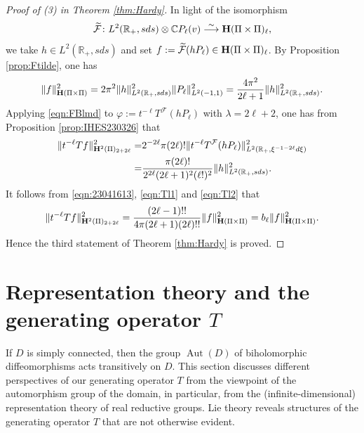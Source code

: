 \documentclass[12pt,leqno]{amsart}
\theoremstyle{plain}
\theoremstyle{definition}
\begin{document}
\begin{proof}
[Proof of (3) in Theorem \ref{thm:Hardy}]
In light of the isomorphism
\[
\widetilde{\mathcal{F}} \colon L^2({\mathbb{R}}_+, s d s) \otimes {\mathbb{C}}P_{\ell}(v) \overset \sim \longrightarrow {\bf{H}}(\Pi \times \Pi)_{\ell}, 
\]
 we take $h \in L^2({\mathbb{R}}_+, s d s)$
 and set $f :=\widetilde{\mathcal{F}}(h P_{\ell}) \in  {\bf{H}}(\Pi \times \Pi)_{\ell}$.  
By Proposition \ref{prop:Ftilde}, 
 one has
\begin{equation}
\label{eqn:Tl1}
\|f\|_{ {\bf{H}}(\Pi \times \Pi)}^2
=2\pi^2 \|h\|_{L^2({\mathbb{R}}_+, s d s)}^2 \|P_{\ell}\|_{L^2(-1,1)}^2
=\frac{4\pi^2}{2 \ell+1}\|h\|_{L^2({\mathbb{R}}_+, s d s)}^2.  
\end{equation}
Applying \eqref{eqn:FBlmd} to 
$
   \varphi:=t^{-\ell}T^{{\mathcal{F}}}(h P_{\ell})
$
 with $\lambda=2\ell+2$, 
 one has from Proposition \ref{prop:IHES230326}
 that 
\begin{align}
\notag
\|t^{-\ell} T f\|_{{\bf{H}}^2(\Pi)_{2+2\ell}}^2
=&2^{-2\ell} \pi (2 \ell)! \|t^{-\ell} T^{\mathcal{F}} (h P_{\ell})\|_{L^2({\mathbb{R}}_+, \xi^{-1-2\ell} d \xi)}^2 
\\
\label{eqn:Tl2}
=&\frac{\pi (2 \ell)!}{2^{2 \ell}(2\ell+1)^2(\ell !)^2}\|h\|_{L^2({\mathbb{R}}_+, s d s)}^2.  
\end{align}
It follows from \eqref{eqn:23041613}, \eqref{eqn:Tl1} and \eqref{eqn:Tl2}
 that 
\[
  \|t^{-\ell} T f\|_{{\bf{H}}^2(\Pi)_{2+2\ell}}^2
  =
  \frac{(2\ell-1)!!}{4 \pi (2 \ell+1) (2\ell)!!}
  \|f\|_{{\bf{H}}(\Pi \times \Pi)}^2
  =
  b_{\ell} \|f\|_{{\bf{H}}(\Pi \times \Pi)}^2.   
\]
Hence the third statement of Theorem \ref{thm:Hardy} is proved.  
\end{proof}



\section{Representation theory and the generating operator $T$}
\label{sec:SL}

If $D$ is simply connected, 
 then the group $\operatorname{Aut}(D)$
 of biholomorphic diffeomorphisms 
 acts transitively on $D$.  
This section discusses different perspectives
 of our generating operator $T$ from the viewpoint
 of the automorphism group of the domain, 
 in particular, from the (infinite-dimensional) representation theory of real reductive groups.  
Lie theory reveals structures
 of the generating operator $T$
 that are not otherwise evident.  
\end{document}
